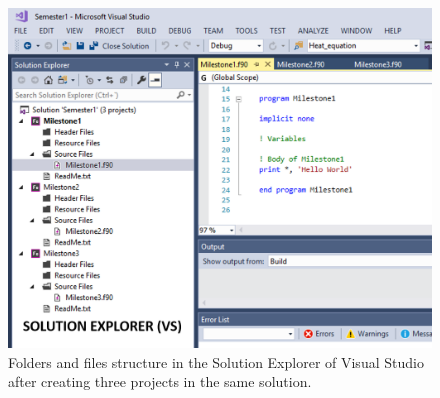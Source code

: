 \begin{figure}
    \centering
    \includegraphics[width= \textwidth]{Figures/Intro4}
    \caption{Folders and files structure in the Solution Explorer of Visual Studio after creating three projects in the same solution.}
    \label{fig:Intro4}
\end{figure}






